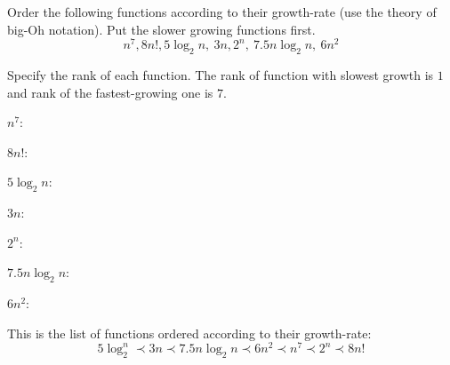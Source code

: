 \documentclass{ximera}
\begin{document}
\begin{question}
Order the following functions according to their growth-rate (use the theory of big-Oh notation). Put the slower growing functions first.
\[
n^7, 8n!, 5 \log_2 n,~ 3n, 2^n, ~ 7.5 n\log_2 n, ~ 6 n^2
\]
\begin{solution}
Specify the rank of each function. The rank of function with slowest growth is $1$ and rank of the fastest-growing one is $7$.
\begin{question}
$n^7$:  
\end{question}
\begin{question}
$8n!$:  
\end{question}
\begin{question}
$5 \log_2 n$:  
\end{question}
\begin{question}
$3n$: 
\end{question}
\begin{question}
$2^n$:  
\end{question}
\begin{question}
$7.5 n \log_2 n$:  
\end{question}
\begin{question}
$6 n^2$:
\end{question}

\end{solution}

This is the list of functions ordered according to their growth-rate:
\begin{equation*}
5 \log_2^n \prec 3n \prec 7.5 n \log_2{n} \prec 6n^2 \prec n^7 \prec 2^n \prec 8n!
\end{equation*}
\end{question}
\end{document}
